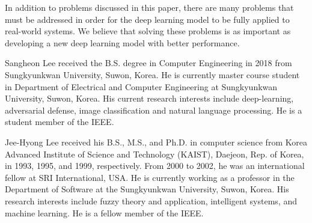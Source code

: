 \documentclass{ieeeaccess}
\begin{document}
In addition to problems discussed in this paper, there are many problems that must be addressed in order for the deep learning model to be fully applied to real-world systems. 
We believe that solving these problems is as important as developing a new deep learning model with better performance.






\begin{IEEEbiography}{Sangheon Lee}
received the B.S. degree in Computer Engineering in 2018 from Sungkyunkwan University, Suwon, Korea. 
He is currently master course student in Department of Electrical and Computer Engineering at Sungkyunkwan University, Suwon, Korea. 
His current research interests include deep-learning, adversarial defense, image classification and natural language processing. 
He is a student member of the IEEE.
\end{IEEEbiography}

\begin{IEEEbiography}{Jee-Hyong Lee}
received his B.S., M.S., and Ph.D. in computer science from Korea Advanced Institute of Science and Technology (KAIST), Daejeon, Rep. of Korea, in 1993, 1995, and 1999, respectively. 
From 2000 to 2002, he was an international fellow at SRI International, USA. 
He is currently working as a professor in the Department of Software at the Sungkyunkwan University, Suwon, Korea. 
His research interests include fuzzy theory and application, intelligent systems, and machine learning. 
He is a fellow member of the IEEE.
\end{IEEEbiography}

\EOD
\end{document}
